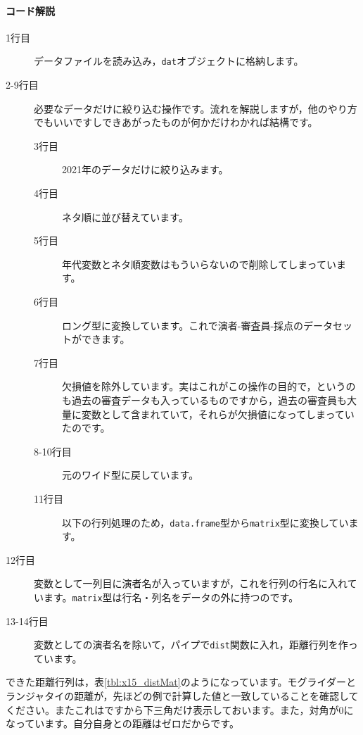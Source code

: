 \documentclass{ltjsbook}
\begin{document}
\paragraph{コード解説}
\begin{description}
    \item[1行目] データファイルを読み込み，\verb|dat|オブジェクトに格納します。
    \item[2-9行目] 必要なデータだけに絞り込む操作です。流れを解説しますが，他のやり方でもいいですしできあがったものが何かだけわかれば結構です。
        \begin{description}
            \item[3行目] 2021年のデータだけに絞り込みます。
            \item[4行目] ネタ順に並び替えています。
            \item[5行目] 年代変数とネタ順変数はもういらないので削除してしまっています。
            \item[6行目] ロング型に変換しています。これで演者-審査員-採点のデータセットができます。
            \item[7行目] 欠損値を除外しています。実はこれがこの操作の目的で，というのも過去の審査データも入っているものですから，過去の審査員も大量に変数として含まれていて，それらが欠損値になってしまっていたのです。
            \item[8-10行目] 元のワイド型に戻しています。
            \item[11行目] 以下の行列処理のため，\verb|data.frame|型から\verb|matrix|型に変換しています。
        \end{description}
    \item[12行目] 変数として一列目に演者名が入っていますが，これを行列の行名に入れています。\verb|matrix|型は行名・列名をデータの外に持つのです。
    \item[13-14行目] 変数としての演者名を除いて，パイプで\verb|dist|関数に入れ，距離行列を作っています。
\end{description}
できた距離行列は，表\ref{tbl:x15_distMat}のようになっています。モグライダーとランジャタイの距離が，先ほどの例で計算した値と一致していることを確認してください。またこれはですから下三角だけ表示しておいます。また，対角が$0$になっています。自分自身との距離はゼロだからです。
\end{document}
